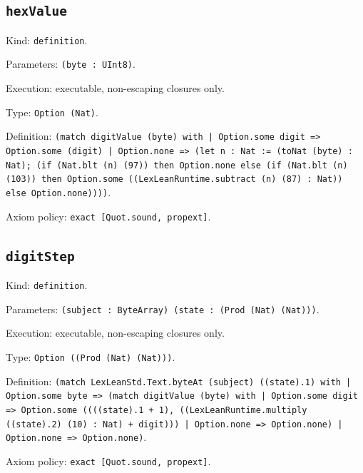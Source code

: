 \documentclass[11pt]{article}
\begin{document}
\subsection*{\texttt{hexValue}}
\noindent Kind: \texttt{definition}.\par
\noindent Parameters: \texttt{(byte : UInt8)}.\par
\noindent Execution: executable, non-escaping closures only.\par
\noindent Type: \texttt{Option (Nat)}.\par
\noindent Definition: \texttt{(match digitValue (byte) with | Option.some digit => Option.some (digit) | Option.none => (let n : Nat := (toNat (byte) : Nat); (if (Nat.blt (n) (97)) then Option.none else (if (Nat.blt (n) (103)) then Option.some ((LexLeanRuntime.subtract (n) (87) : Nat)) else Option.none))))}.\par
\noindent Axiom policy: \texttt{exact [Quot.sound, propext]}.\par
\subsection*{\texttt{digitStep}}
\noindent Kind: \texttt{definition}.\par
\noindent Parameters: \texttt{(subject : ByteArray) (state : (Prod (Nat) (Nat)))}.\par
\noindent Execution: executable, non-escaping closures only.\par
\noindent Type: \texttt{Option ((Prod (Nat) (Nat)))}.\par
\noindent Definition: \texttt{(match LexLeanStd.Text.byteAt (subject) ((state).1) with | Option.some byte => (match digitValue (byte) with | Option.some digit => Option.some ((((state).1 + 1), ((LexLeanRuntime.multiply ((state).2) (10) : Nat) + digit))) | Option.none => Option.none) | Option.none => Option.none)}.\par
\noindent Axiom policy: \texttt{exact [Quot.sound, propext]}.\par
\end{document}
